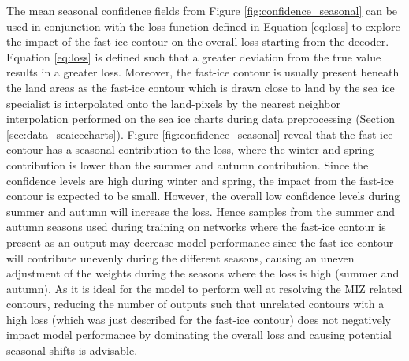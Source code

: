 \documentclass[../main/thesis]{subfiles}
\begin{document}
The mean seasonal confidence fields from Figure \ref{fig:confidence_seasonal} can be used in conjunction with the loss function defined in Equation \ref{eq:loss} to explore the impact of the fast-ice contour on the overall loss starting from the decoder. Equation \ref{eq:loss} is defined such that a greater deviation from the true value results in a greater loss. Moreover, the fast-ice contour is usually present beneath the land areas as the fast-ice contour which is drawn close to land by the sea ice specialist is interpolated onto the land-pixels by the nearest neighbor interpolation \citep{Wang2017} performed on the sea ice charts during data preprocessing (Section \ref{sec:data_seaicecharts}). Figure \ref{fig:confidence_seasonal} reveal that the fast-ice contour has a seasonal contribution to the loss, where the winter and spring contribution is lower than the summer and autumn contribution. Since the confidence levels are high during winter and spring, the impact from the fast-ice contour is expected to be small. However, the overall low confidence levels during summer and autumn will increase the loss. Hence samples from the summer and autumn seasons used during training on networks where the fast-ice contour is present as an output may decrease model performance since the fast-ice contour will contribute unevenly during the different seasons, causing an uneven adjustment of the weights during the seasons where the loss is high (summer and autumn). As it is ideal for the model to perform well at resolving the MIZ related contours, reducing the number of outputs such that unrelated contours with a high loss (which was just described for the fast-ice contour) does not negatively impact model performance by dominating the overall loss and causing potential seasonal shifts is advisable.
\end{document}
